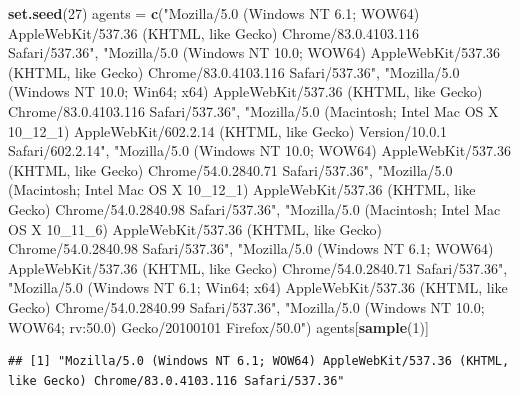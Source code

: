 \documentclass[
  12pt,
  a4paper,
  oneside]{book}
\newenvironment{Shaded}{\begin{snugshade}}{\end{snugshade}}
\newcommand{\DecValTok}[1]{\textcolor[rgb]{0.00,0.00,0.81}{#1}}
\newcommand{\KeywordTok}[1]{\textcolor[rgb]{0.13,0.29,0.53}{\textbf{#1}}}
\newcommand{\NormalTok}[1]{#1}
\newcommand{\StringTok}[1]{\textcolor[rgb]{0.31,0.60,0.02}{#1}}
\begin{document}
\begin{Shaded}
\begin{Highlighting}[]
\KeywordTok{set.seed}\NormalTok{(}\DecValTok{27}\NormalTok{)}
\NormalTok{agents =}\StringTok{ }\KeywordTok{c}\NormalTok{(}\StringTok{"Mozilla/5.0 (Windows NT 6.1; WOW64) AppleWebKit/537.36 (KHTML, like Gecko) Chrome/83.0.4103.116 Safari/537.36"}\NormalTok{, }
    \StringTok{"Mozilla/5.0 (Windows NT 10.0; WOW64) AppleWebKit/537.36 (KHTML, like Gecko) Chrome/83.0.4103.116 Safari/537.36"}\NormalTok{, }
    \StringTok{"Mozilla/5.0 (Windows NT 10.0; Win64; x64) AppleWebKit/537.36 (KHTML, like Gecko) Chrome/83.0.4103.116 Safari/537.36"}\NormalTok{, }
    \StringTok{"Mozilla/5.0 (Macintosh; Intel Mac OS X 10_12_1) AppleWebKit/602.2.14 (KHTML, like Gecko) Version/10.0.1 Safari/602.2.14"}\NormalTok{, }
    \StringTok{"Mozilla/5.0 (Windows NT 10.0; WOW64) AppleWebKit/537.36 (KHTML, like Gecko) Chrome/54.0.2840.71 Safari/537.36"}\NormalTok{, }
    \StringTok{"Mozilla/5.0 (Macintosh; Intel Mac OS X 10_12_1) AppleWebKit/537.36 (KHTML, like Gecko) Chrome/54.0.2840.98 Safari/537.36"}\NormalTok{, }
    \StringTok{"Mozilla/5.0 (Macintosh; Intel Mac OS X 10_11_6) AppleWebKit/537.36 (KHTML, like Gecko) Chrome/54.0.2840.98 Safari/537.36"}\NormalTok{, }
    \StringTok{"Mozilla/5.0 (Windows NT 6.1; WOW64) AppleWebKit/537.36 (KHTML, like Gecko) Chrome/54.0.2840.71 Safari/537.36"}\NormalTok{, }
    \StringTok{"Mozilla/5.0 (Windows NT 6.1; Win64; x64) AppleWebKit/537.36 (KHTML, like Gecko) Chrome/54.0.2840.99 Safari/537.36"}\NormalTok{, }
    \StringTok{"Mozilla/5.0 (Windows NT 10.0; WOW64; rv:50.0) Gecko/20100101 Firefox/50.0"}\NormalTok{)}
\NormalTok{agents[}\KeywordTok{sample}\NormalTok{(}\DecValTok{1}\NormalTok{)]}
\end{Highlighting}
\end{Shaded}

\begin{verbatim}
## [1] "Mozilla/5.0 (Windows NT 6.1; WOW64) AppleWebKit/537.36 (KHTML, like Gecko) Chrome/83.0.4103.116 Safari/537.36"
\end{verbatim}
\end{document}
